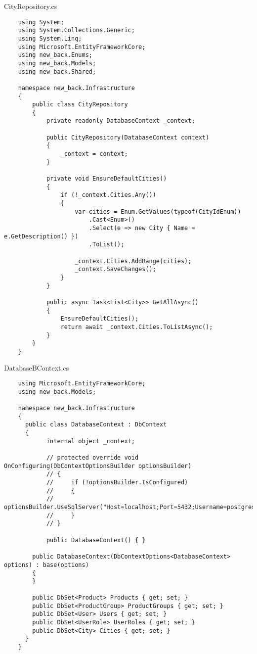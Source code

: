 CityRepository.cs
\lstset{style=sharpc}
\begin{lstlisting}
    using System;
    using System.Collections.Generic;
    using System.Linq;
    using Microsoft.EntityFrameworkCore;
    using new_back.Enums;
    using new_back.Models;
    using new_back.Shared;
    
    namespace new_back.Infrastructure
    {
        public class CityRepository
        {
            private readonly DatabaseContext _context;
    
            public CityRepository(DatabaseContext context)
            {
                _context = context;
            }
    
            private void EnsureDefaultCities()
            {
                if (!_context.Cities.Any())
                {
                    var cities = Enum.GetValues(typeof(CityIdEnum))
                        .Cast<Enum>()
                        .Select(e => new City { Name = e.GetDescription() })
                        .ToList();
    
                    _context.Cities.AddRange(cities);
                    _context.SaveChanges();
                }
            }
    
            public async Task<List<City>> GetAllAsync()
            {
                EnsureDefaultCities();
                return await _context.Cities.ToListAsync();
            }
        }
    }    
\end{lstlisting}

DatabaseBContext.cs
\lstset{style=sharpc}
\begin{lstlisting}
    using Microsoft.EntityFrameworkCore;
    using new_back.Models;
    
    namespace new_back.Infrastructure
    {  
      public class DatabaseContext : DbContext
      {
            internal object _context;
    
            // protected override void OnConfiguring(DbContextOptionsBuilder optionsBuilder)
            // {
            //     if (!optionsBuilder.IsConfigured)
            //     {
            //         optionsBuilder.UseSqlServer("Host=localhost;Port=5432;Username=postgres;Password=postgres;Database=AnimalSharing;");
            //     }
            // }
    
            public DatabaseContext() { }
    
        public DatabaseContext(DbContextOptions<DatabaseContext> options) : base(options)
        {
        }
    
        public DbSet<Product> Products { get; set; }
        public DbSet<ProductGroup> ProductGroups { get; set; }
        public DbSet<User> Users { get; set; }
        public DbSet<UserRole> UserRoles { get; set; }
        public DbSet<City> Cities { get; set; }
      }
    }
\end{lstlisting}

